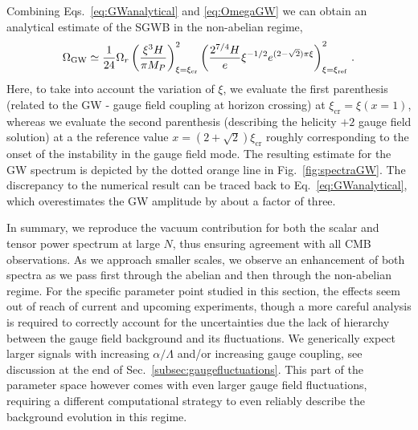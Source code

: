 {Combining Eqs.~\eqref{eq:GWanalytical} and \eqref{eq:OmegaGW} we can obtain an analytical estimate of the SGWB in the non-abelian regime,
\begin{equation}
 \Omega_{\rm GW} \simeq \frac{1}{24} \Omega_r \left( \frac{\xi^3 H}{\pi M_P} \right)^2_{\xi = \xi_\text{cr}}  \left( \frac{2^{7/4} H}{e} \xi^{-1/2} e^{(2 - \sqrt{2}) \pi \xi}  \right)^2_{\xi = \xi_\text{ref}} \,.
 \label{eq:GWapprox}
\end{equation}
Here, to take into account the variation of $\xi$, we evaluate the first parenthesis (related to the GW - gauge field coupling at horizon crossing) at $\xi_\text{cr} = \xi(x = 1)$, whereas we evaluate the second parenthesis (describing the helicity $+2$ gauge field solution) at a the reference value $x = (2 + \sqrt{2}) \xi_\text{cr}$ roughly corresponding to the onset of the instability in the gauge field mode. The resulting estimate for the GW spectrum is depicted by the dotted orange line in  Fig.~\ref{fig:spectraGW}. The discrepancy to the numerical result can be traced back to Eq.~\eqref{eq:GWanalytical}, which overestimates the GW amplitude by about a factor of three.}


In summary, we reproduce the vacuum contribution for both the scalar and tensor power spectrum at large $N$,  thus ensuring agreement with all CMB observations. As we approach smaller scales, we observe an enhancement of both spectra as we pass first through the abelian and then through the non-abelian regime. For the specific parameter point studied in this section, the effects seem out of reach of current and upcoming experiments, though a more careful analysis is required to correctly account for the uncertainties due the lack of hierarchy between the gauge field background and its fluctuations. We generically expect larger signals with increasing $\alpha/\Lambda$ and/or increasing gauge coupling, see discussion at the end of Sec.~\ref{subsec:gaugefluctuations}. This part of the parameter space however comes with even larger gauge field fluctuations, requiring a different computational strategy to even reliably describe the background evolution in this regime.
